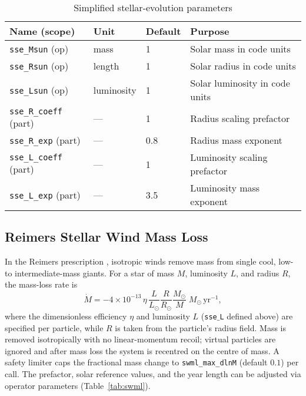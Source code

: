 \documentclass[11pt]{article}
\begin{document}
\begin{table}[h]
\centering\footnotesize
\caption{Simplified stellar-evolution parameters}
\label{tab:sse}
\begin{tabular}{@{}llll@{}}
\toprule
Name (scope) & Unit & Default & Purpose \\
\midrule
\texttt{sse\_Msun}   (op) & mass      & 1   & Solar mass in code units\\
\texttt{sse\_Rsun}   (op) & length     & 1   & Solar radius in code units\\
\texttt{sse\_Lsun}   (op) & luminosity & 1   & Solar luminosity in code units\\
\texttt{sse\_R\_coeff} (part) & —       & 1   & Radius scaling prefactor\\
\texttt{sse\_R\_exp}   (part) & —       & 0.8 & Radius mass exponent\\
\texttt{sse\_L\_coeff} (part) & —       & 1   & Luminosity scaling prefactor\\
\texttt{sse\_L\_exp}   (part) & —       & 3.5 & Luminosity mass exponent\\
\bottomrule
\end{tabular}
\end{table}

\subsection{Reimers Stellar Wind Mass Loss}
\label{sec:swml}
In the Reimers prescription \citep{Reimers1975}, isotropic winds remove mass from single cool, low- to intermediate-mass giants. For a star of mass $M$, luminosity $L$, and radius
$R$, the mass-loss rate is
\[
\dot M = -4\times10^{-13}\,\eta\,\frac{L}{L_\odot}\frac{R}{R_\odot}\frac{M_\odot}{M}
\;M_\odot\,\mathrm{yr}^{-1},
\]
where the dimensionless efficiency $\eta$ and luminosity $L$ (\texttt{sse$\_$L} defined above) are specified per particle, while $R$ is taken from the particle's radius field.
Mass is removed isotropically with no linear-momentum
recoil; virtual particles are ignored and after mass loss the system is
recentred on the centre of mass.  A safety limiter caps the fractional
mass change to \texttt{swml\_max\_dlnM} (default $0.1$) per call.  The
prefactor, solar reference values, and the year length can be adjusted via
operator parameters (Table~\ref{tab:swml}).
\end{document}
